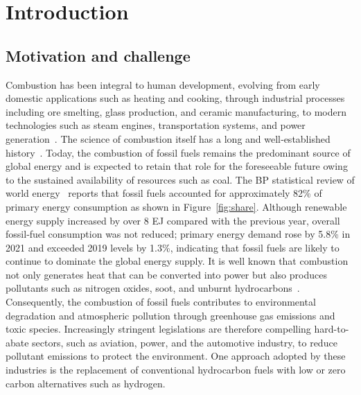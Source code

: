 
\chapter{Introduction}  %

\ifpdf
    \graphicspath{{Chapter1/Figs/Raster/}{Chapter1/Figs/PDF/}{Chapter1/Figs/}}
\else
    \graphicspath{{Chapter1/Figs/Vector/}{Chapter1/Figs/}}
\fi


\section{Motivation and challenge \texorpdfstring{}{}} %

\noindent Combustion has been integral to human development, evolving from early domestic applications such as heating and cooking, through industrial processes including ore smelting, glass production, and ceramic manufacturing, to modern technologies such as steam engines, transportation systems, and power generation~\citep{Lackner}. The science of combustion itself has a long and well‑established history~\citep{Bilger,Lackner,Allen,Deane,Richardson,Stavrianos}. Today, the combustion of fossil fuels remains the predominant source of global energy and is expected to retain that role for the foreseeable future owing to the sustained availability of resources such as coal.  The BP statistical review of world energy~\citep{BP} reports that fossil fuels accounted for approximately 82\% of primary energy consumption as shown in Figure~\ref{fig:share}. Although renewable energy supply increased by over 8 EJ compared with the previous year, overall fossil‑fuel consumption was not reduced; primary energy demand rose by 5.8\% in 2021 and exceeded 2019 levels by 1.3\%, indicating that fossil fuels are likely to continue to dominate the global energy supply. It is well known that combustion not only generates heat that can be converted into power but also produces pollutants such as nitrogen oxides, soot, and unburnt hydrocarbons~\citep {Peters_2000,lieuwen}. Consequently, the combustion of fossil fuels contributes to environmental degradation and atmospheric pollution through greenhouse gas emissions and toxic species. Increasingly stringent legislations are therefore compelling hard-to-abate sectors, such as aviation, power, and the automotive industry, to reduce pollutant emissions to protect the environment. One approach adopted by these industries is the replacement of conventional hydrocarbon fuels with low or zero carbon alternatives such as hydrogen. 

